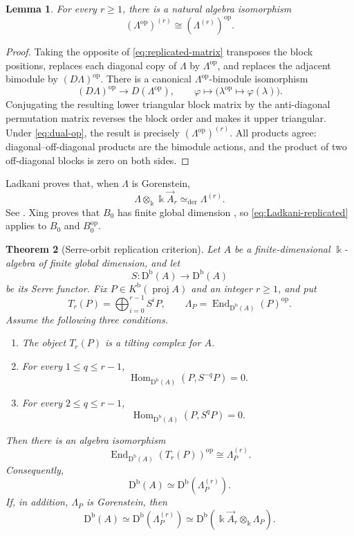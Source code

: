 \documentclass[12pt,a4paper,english,reqno]{amsart}
\theoremstyle{plain}
\newtheorem{theorem}{Theorem}[section]
\newtheorem{lemma}[theorem]{Lemma}
\theoremstyle{definition}
\newcommand{\kk}{\Bbbk}
\newcommand{\Db}{\mathrm D^{\mathrm b}}
\newcommand{\Hom}{\operatorname{Hom}}
\newcommand{\End}{\operatorname{End}}
\newcommand{\op}{\mathrm{op}}
\begin{document}
\begin{lemma}
\label{lem:replicated-op}
For every $r\geq1$, there is a natural algebra isomorphism
\begin{equation}
 (\Lambda^{\op})^{(r)}
 \cong(\Lambda^{(r)})^{\op}.
\label{eq:replicated-op}
\end{equation}
\end{lemma}

\begin{proof}
Taking the opposite of \eqref{eq:replicated-matrix} transposes the block
positions, replaces each diagonal copy of $\Lambda$ by $\Lambda^{\op}$,
and replaces the adjacent bimodule by $(D\Lambda)^{\op}$.  There is a
canonical $\Lambda^{\op}$-bimodule isomorphism
\begin{equation}
 (D\Lambda)^{\op}\longrightarrow D(\Lambda^{\op}),
 \qquad \varphi\longmapsto\bigl(\lambda^{\op}\mapsto\varphi(\lambda)\bigr).
\label{eq:dual-op}
\end{equation}
Conjugating the resulting lower triangular block matrix by the
anti-diagonal permutation matrix reverses the block order and makes it
upper triangular.  Under \eqref{eq:dual-op}, the result is precisely
$(\Lambda^{\op})^{(r)}$.  All products agree: diagonal--off-diagonal
products are the bimodule actions, and the product of two off-diagonal
blocks is zero on both sides.
\end{proof}

Ladkani proves that, when $\Lambda$ is Gorenstein,
\begin{equation}
 \Lambda\otimes_{\kk}\kk\vec A_r
 \simeq_{\mathrm{der}}\Lambda^{(r)}.
\label{eq:Ladkani-replicated}
\end{equation}
See \cite[Corollary~1.3]{Ladkani}.  Xing proves that $B_0$ has finite global
dimension \cite[Proposition~4.34]{Xing}, so
\eqref{eq:Ladkani-replicated} applies to $B_0$ and $B_0^{\op}$.

\begin{theorem}[Serre-orbit replication criterion]
\label{thm:serre-orbit-replication}
Let $A$ be a finite-dimensional $\kk$-algebra of finite global
dimension, and let
\[
 S\colon\Db(A)\longrightarrow\Db(A)
\]
be its Serre functor.  Fix $P\in K^{\mathrm b}(\operatorname{proj}A)$ and
an integer $r\geq1$, and put
\[
 T_r(P)=\bigoplus_{i=0}^{r-1}S^iP,
 \qquad
 \Lambda_P=\End_{\Db(A)}(P)^{\op}.
\]
Assume the following three conditions.
\begin{enumerate}
\item The object $T_r(P)$ is a tilting complex for $A$.
\item For every $1\leq q\leq r-1$,
\[
 \Hom_{\Db(A)}(P,S^{-q}P)=0.
\]
\item For every $2\leq q\leq r-1$,
\[
 \Hom_{\Db(A)}(P,S^qP)=0.
\]
\end{enumerate}
Then there is an algebra isomorphism
\[
 \End_{\Db(A)}(T_r(P))^{\op}
 \cong \Lambda_P^{(r)}.
\]
Consequently,
\[
 \Db(A)\simeq\Db(\Lambda_P^{(r)}).
\]
If, in addition, $\Lambda_P$ is Gorenstein, then
\[
 \Db(A)
 \simeq\Db(\Lambda_P^{(r)})
 \simeq
 \Db(\kk\vec A_r\otimes_{\kk}\Lambda_P).
\]
\end{theorem}
\end{document}
